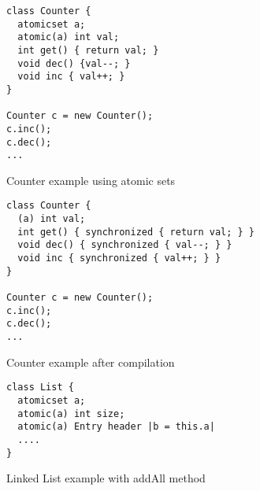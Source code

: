\begin{figure}[tp]
\begin{lstlisting}
class Counter {
  atomicset a;
  atomic(a) int val;
  int get() { return val; }
  void dec() {val--; }
  void inc { val++; }
}

Counter c = new Counter();
c.inc();
c.dec();
...
\end{lstlisting}
\caption{Counter example using atomic sets}
\label{lst:acCounter}
\end{figure}



\begin{figure}[tp]
\begin{lstlisting}
class Counter {
  (a) int val;
  int get() { synchronized { return val; } }
  void dec() { synchronized { val--; } }
  void inc { synchronized { val++; } }
}

Counter c = new Counter();
c.inc();
c.dec();
...
\end{lstlisting}
\caption{Counter example after compilation}
\label{lst:acCounterCompiled}
\end{figure}


\begin{figure}[tp]
\begin{lstlisting}
class List {
  atomicset a;
  atomic(a) int size;
  atomic(a) Entry header |b = this.a|
  ....
}
\end{lstlisting}
\caption{Linked List example with addAll method}
\label{lst:acList}
\end{figure}





































